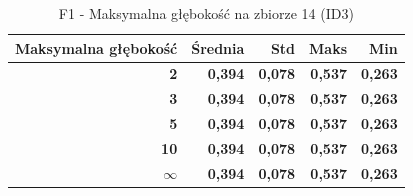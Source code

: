 \begin{table}[htbp]
\centering
\small
\setlength{\tabcolsep}{6pt}
\renewcommand{\arraystretch}{1.2}
\caption{F1 - Maksymalna głębokość na zbiorze 14 (ID3)}
\label{tab:ID3_max_depth_14_f1}
\begin{tabular}{r|r|r|r|r}
\toprule
Maksymalna głębokość & Średnia & Std & Maks & Min \\
\hline
\textbf{2} & \textbf{0,394} & \textbf{0,078} & \textbf{0,537} & \textbf{0,263} \\
\textbf{3} & \textbf{0,394} & \textbf{0,078} & \textbf{0,537} & \textbf{0,263} \\
\textbf{5} & \textbf{0,394} & \textbf{0,078} & \textbf{0,537} & \textbf{0,263} \\
\textbf{10} & \textbf{0,394} & \textbf{0,078} & \textbf{0,537} & \textbf{0,263} \\
\textbf{$\infty$} & \textbf{0,394} & \textbf{0,078} & \textbf{0,537} & \textbf{0,263} \\
\bottomrule
\end{tabular}
\end{table}